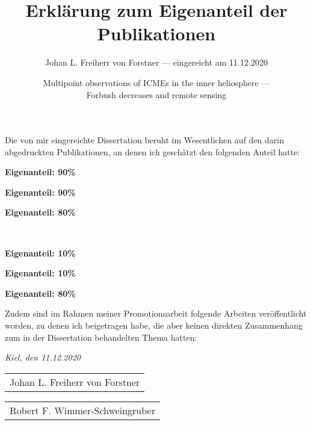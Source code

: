 \documentclass{scrartcl}
\title{\vspace{-2cm} Erklärung zum Eigenanteil der Publikationen \vspace{-2ex}}
\author{Johan L. Freiherr von Forstner --- eingereicht am 11.12.2020}
\date{\vspace{-1ex} Multipoint observations of ICMEs in the inner heliosphere ---\\ Forbush decreases and remote sensing}
\begin{document}
	\maketitle
	\vspace{-1ex}
	Die von mir eingereichte Dissertation beruht im Wesentlichen auf den darin abgedruckten Publikationen, an denen ich geschätzt den folgenden Anteil hatte:
	
	\noindent{} \hfill \textbf{Eigenanteil: 90\%}
	
	\noindent{} \hfill \textbf{Eigenanteil: 90\%}
	
	\noindent{} \hfill \textbf{Eigenanteil: 80\%}
	
	\noindent{}\\ \strut\hfill \textbf{Eigenanteil: 10\%}
	
	\noindent{} \hfill \textbf{Eigenanteil: 10\%}
	
	\noindent{} \hfill \textbf{Eigenanteil: 80\%}
	
	Zudem sind im Rahmen meiner Promotionsarbeit folgende Arbeiten veröffentlicht worden, zu denen ich beigetragen habe, die aber keinen direkten Zusammenhang zum in der Dissertation behandelten Thema hatten:
	
	\noindent{}
	
	\noindent{}
	
	\noindent{}
	
	\noindent{}
	
	\noindent{}
	
	\noindent{}
	
	\noindent{}
	
	\bigskip
	
	\noindent\textit{Kiel, den 11.12.2020}
	
	\smallskip
	
	\begin{flushright}
		\begin{tabular}{m{8cm}}
			\\ \hline
			\centering Johan L. Freiherr von Forstner \\
		\end{tabular}
	\end{flushright}
	\bigskip
	\begin{flushright}
		\begin{tabular}{m{8cm}}
			\\ \hline
			\centering Robert F. Wimmer-Schweingruber \\
		\end{tabular}
	\end{flushright}
\end{document}
